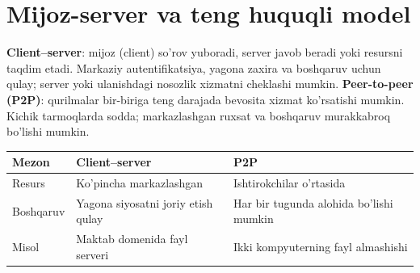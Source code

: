 \documentclass[11pt,a4paper,oneside]{book}
\newcommand{\kw}[1]{\textbf{\color{Deep}#1}}
\begin{document}
\section{Mijoz-server va teng huquqli model}
\kw{Client--server}: mijoz (client) so'rov yuboradi, server javob beradi yoki resursni taqdim etadi. Markaziy autentifikatsiya, yagona zaxira va boshqaruv uchun qulay; server yoki ulanishdagi nosozlik xizmatni cheklashi mumkin. \kw{Peer-to-peer (P2P)}: qurilmalar bir-biriga teng darajada bevosita xizmat ko'rsatishi mumkin. Kichik tarmoqlarda sodda; markazlashgan ruxsat va boshqaruv murakkabroq bo'lishi mumkin.
\par\medskip
\par\medskip
\begin{tabularx}{\textwidth}{p{}YY}\toprule
Mezon & Client--server & P2P\\\midrule
Resurs & Ko'pincha markazlashgan & Ishtirokchilar o'rtasida\\
Boshqaruv & Yagona siyosatni joriy etish qulay & Har bir tugunda alohida bo'lishi mumkin\\
Misol & Maktab domenida fayl serveri & Ikki kompyuterning fayl almashishi\\\bottomrule\end{tabularx}
\end{document}
